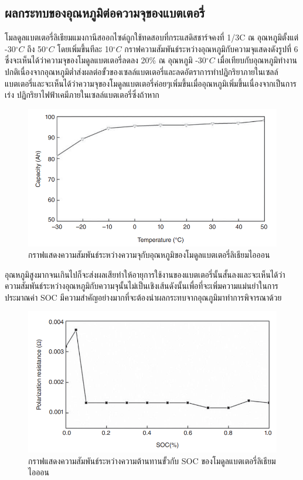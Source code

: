 \subsection{ผลกระทบของอุณหภูมิต่อความจุของแบตเตอรี่}
โมลดูลแบตเตอรี่ลิเธียมแมงกานีสออกไซด์ถูกใช้ทดสอบที่กระแสดิสชาร์จคงที่ 1/3C ณ อุณหภูมิตั้งแต่ -30$^{\circ}C$ ถึง 50$^{\circ}C$ โดยเพิ่มขึ้นทีละ 10$^{\circ}C$  กราฟความสัมพันธ์ระหว่างอุณหภูมิกับความจุแสดงดังรูปที่ 6 ซึ่งจะเห็นได้ว่าความจุของโมดูลแบตเตอรี่ลดลง 20\% ณ อุณหภูมิ -30$^{\circ}C$ เมื่อเทียบกับอุณหภูมิทำงานปกติเนื่องจากอุณหภูมิต่ำส่งผลต่อขั้วของเซลล์แบตเตอรี่และลดอัตราการทำปฏิกริยาภายในเซลล์แบตเตอรี่และจะเห็นได้ว่าความจุของโมดูลแบตเตอรี่ค่อยๆเพิ่มขึ้นเมื่ออุณหภูมิเพิ่มขึ้นเนื่องจากเป็นการเร่ง
ปฏิกริยาไฟฟ้าเคมีภายในเซลล์แบตเตอรี่ซึ่งถ้าหาก\newline
\begin{center}
	\begin{figure}[!h]
		\includegraphics[width=0.6\linewidth]{Chapters/img/Current_vs_Temp.png}
			\centering
			\captionsetup{justification=centering,margin=2cm}
			\caption{กราฟแสดงความสัมพันธ์ระหว่างความจุกับอุณหภูมิของโมดูลแบตเตอรี่ลิเธียมไอออน}
	\end{figure}
\end{center}
อุณหภูมิสูงมากจนเกินไปก็จะส่งผลเสียทำให้อายุการใช้งานของแบตเตอรี่นั้นสั้นลงและจะเห็นได้ว่าความสัมพันธ์ระหว่างอุณหภูมิกับความจุนั้นไม่เป็นเชิงเส้นดังนั้นเพื่อที่จะเพิ่มความแม่นยำในการประมาณค่า SOC มีความสำคัญอย่างมากที่จะต้องนำผลกระทบจากอุณภูมิมาทำการพิจารณาด้วย\newline
\begin{center}
	\begin{figure}[!h]
		\includegraphics[width=0.6\linewidth]{Chapters/img/Pol_Resistance_vs_SOC.png}
			\centering
			\captionsetup{justification=centering,margin=2cm}
			\caption{กราฟแสดงความสัมพันธ์ระหว่างความต้านทานขั้วกับ SOC ของโมดูลแบตเตอรี่ลิเธียมไอออน}
	\end{figure}
\end{center}

